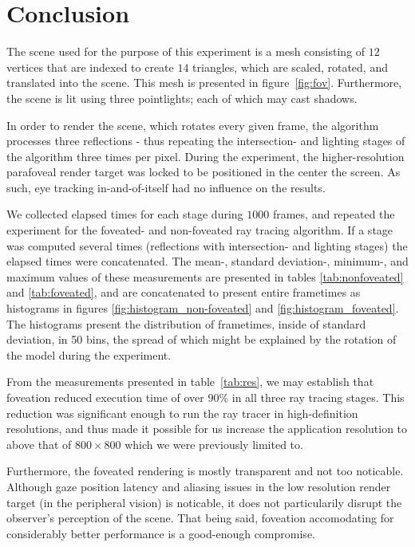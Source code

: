 
\section{Conclusion}
The scene used for the purpose of this experiment is a mesh consisting of $12$ vertices that are indexed to create $14$ triangles, which are scaled, rotated, and translated into the scene.
This mesh is presented in figure~\ref{fig:fov}.
Furthermore, the scene is lit using three pointlights; each of which may cast shadows.

In order to render the scene, which rotates every given frame, the algorithm processes three reflections - thus repeating the intersection- and lighting stages of the algorithm three times per pixel.
During the experiment, the higher-resolution parafoveal render target was locked to be positioned in the center the screen.
As such, eye tracking in-and-of-itself had no influence on the results.

We collected elapsed times for each stage during $1000$ frames, and repeated the experiment for the foveated- and non-foveated ray tracing algorithm.
If a stage was computed several times (reflections with intersection- and lighting stages) the elapsed times were concatenated.
The mean-, standard deviation-, minimum-, and maximum values of these measurements are presented in tables \ref{tab:nonfoveated} and \ref{tab:foveated}, and are concatenated to present entire frametimes as histograms in figures \ref{fig:histogram_non-foveated} and \ref{fig:histogram_foveated}.
The histograms present the distribution of frametimes, inside of standard deviation, in 50 bins, the spread of which might be explained by the rotation of the model during the experiment.

From the measurements presented in table~\ref{tab:res}, we may establish that foveation reduced execution time of over $90\%$ in all three ray tracing stages.
This reduction was significant enough to run the ray tracer in high-definition resolutions, and thus made it possible for us increase the application resolution to above that of $800\times 800$ which we were previously limited to.

Furthermore, the foveated rendering is mostly transparent and not too noticable.
Although gaze position latency and aliasing issues in the low resolution render target (in the peripheral vision) is noticable, it does not particularily disrupt the observer's perception of the scene.
That being said, foveation accomodating for considerably better performance is a good-enough compromise.

